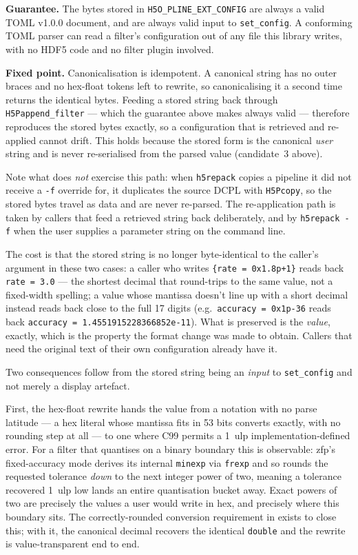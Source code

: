 \documentclass[../RFC-HDFG-2026-001.tex]{subfiles}
\begin{document}
\begin{notebox}
\textbf{Guarantee.}  The bytes stored in \texttt{H5O\_PLINE\_EXT\_CONFIG}
are always a valid TOML v1.0.0 document, and are always valid input to
\texttt{set\_config}.  A conforming TOML parser can read a filter's
configuration out of any file this library writes, with no HDF5 code and no
filter plugin involved.

\textbf{Fixed point.}  Canonicalisation is idempotent.  A canonical string
has no outer braces and no hex-float tokens left to rewrite, so
canonicalising it a second time returns the identical bytes.  Feeding a
stored string back through \texttt{H5Pappend\_filter} --- which the
guarantee above makes always valid --- therefore reproduces the stored bytes
exactly, so a configuration that is retrieved and re-applied cannot drift.
This holds because the stored form is the canonical \emph{user} string and
is never re-serialised from the parsed value (candidate~3 above).

Note what does \emph{not} exercise this path: when \texttt{h5repack} copies a
pipeline it did not receive a \texttt{-f} override for, it duplicates the
source DCPL with \texttt{H5Pcopy}, so the stored bytes travel as data and are
never re-parsed.  The re-application path is taken by callers that feed a
retrieved string back deliberately, and by \texttt{h5repack~-f} when the user
supplies a parameter string on the command line.
\end{notebox}

The cost is that the stored string is no longer byte-identical to the
caller's argument in these two cases: a caller who writes
\texttt{\{rate = 0x1.8p+1\}} reads back \texttt{rate = 3.0} --- the shortest
decimal that round-trips to the same value, not a fixed-width spelling; a
value whose mantissa doesn't line up with a short decimal instead reads back
close to the full 17 digits (e.g.\ \texttt{accuracy = 0x1p-36} reads back
\texttt{accuracy = 1.4551915228366852e-11}).  What is preserved is the
\emph{value}, exactly, which is the property the format change was made to
obtain.  Callers that need the original text of their own configuration
already have it.

Two consequences follow from the stored string being an \emph{input} to
\texttt{set\_config} and not merely a display artefact.

First, the hex-float rewrite hands the value from a notation with no parse
latitude --- a hex literal whose mantissa fits in 53 bits converts exactly,
with no rounding step at all --- to one where C99 permits a 1~ulp
implementation-defined error.  For a filter that quantises on a binary
boundary this is observable: zfp's fixed-accuracy mode derives its internal
\texttt{minexp} via \texttt{frexp} and so rounds the requested tolerance
\emph{down} to the next integer power of two, meaning a tolerance recovered
1~ulp low lands an entire quantisation bucket away.  Exact powers of two
are precisely the values a user would write in hex, and precisely where
this boundary sits.  The correctly-rounded conversion requirement in
 exists to close this; with it, the
canonical decimal recovers the identical \texttt{double} and the rewrite is
value-transparent end to end.
\end{document}
